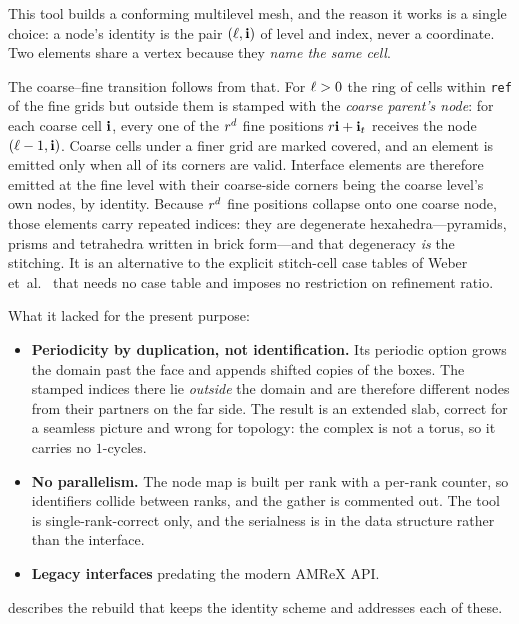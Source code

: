 This tool builds a conforming multilevel mesh, and the reason it works is a
single choice: a node's identity is the pair $(\ell,\mathbf{i})$ of level and index,
never a coordinate. Two elements share a vertex because they \emph{name the
same cell}.

The coarse--fine transition follows from that. For $\ell > 0$ the ring of cells
within \texttt{ref} of the fine grids but outside them is stamped with the
\emph{coarse parent's node}: for each coarse cell $\mathbf{i}$, every one of the
$r^{d}$ fine positions $r\mathbf{i} + \mathbf{i}_t$ receives the node
$(\ell-1, \mathbf{i})$. Coarse cells under a finer grid are marked covered, and an
element is emitted only when all of its corners are valid. Interface elements
are therefore emitted at the fine level with their coarse-side corners being
the coarse level's own nodes, by identity. Because $r^{d}$ fine positions
collapse onto one coarse node, those elements carry repeated indices: they are
degenerate hexahedra---pyramids, prisms and tetrahedra written in brick
form---and that degeneracy \emph{is} the stitching. It is an alternative to the
explicit stitch-cell case tables of Weber
et~al.~\cite{weber2001crackfree,weber2012parallel} that needs no case table and
imposes no restriction on refinement ratio.

What it lacked for the present purpose:

\begin{itemize}[leftmargin=*]
\item \textbf{Periodicity by duplication, not identification.} Its periodic
  option grows the domain past the face and appends shifted copies of the
  boxes. The stamped indices there lie \emph{outside} the domain and are
  therefore different nodes from their partners on the far side. The result is
  an extended slab, correct for a seamless picture and wrong for topology: the
  complex is not a torus, so it carries no $1$-cycles.
\item \textbf{No parallelism.} The node map is built per rank with a per-rank
  counter, so identifiers collide between ranks, and the gather is commented
  out. The tool is single-rank-correct only, and the serialness is in the data
  structure rather than the interface.
\item \textbf{Legacy interfaces} predating the modern AMReX API.
\end{itemize}

 describes the rebuild that keeps the identity scheme and
addresses each of these.

